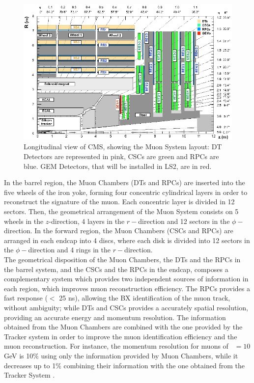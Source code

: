 \begin{center}
\begin{figure}[h]
\centering
\includegraphics[scale=0.4]{figuras/Chapter2/MuonSystem}
\caption{Longitudinal view of CMS, showing the Muon System layout: DT Detectors are represented in pink,
CSCs are green and RPCs are blue. GEM Detectors, that will be installed in LS2, are in red.}\label{figchp2:MuonSystem}
\end{figure}
\end{center}

In the barrel region, the Muon Chambers (DTs and RPCs) are inserted into the 
five wheels of the iron yoke, forming four concentric cylindrical layers in order
to reconstruct the signature of the muon. Each concentric layer is divided
in 12 sectors. Then, the geometrical arrangement of the Muon System consists on 
5 wheels in the $z$-direction, 4 layers in the $r-$direction and 12 sectors
in the $\phi-$direction. In the forward region, the Muon Chambers (CSCs and RPCs)
are arranged in each endcap into 4 discs, where each disk is divided into 
12 sectors in the $\phi-$direction and 4 rings in the $r-$direction. \\

The geometrical disposition of the Muon Chambers, the DTs and the RPCs in the barrel system, and 
the CSCs and the RPCs in the endcap, composes a complementary system which provides
two independent sources of information in each region, which improves 
muon reconstruction efficiency. The RPCs provides a fast response ($<$ 25 ns), allowing 
the BX identification of the muon track, without ambiguity; while 
DTs and CSCs provides a accurately spatial resolution, providing an accurate energy 
and momentum resolution. The information obtained from the Muon Chambers
are combined with the one provided by the Tracker system in order to 
improve the muon identification efficiency and the muon reconstruction. For instance,
the momentum resolution for muons of \pt~$= 10$ GeV is 10$\%$ using only the information
provided by Muon Chambers, while it decreases up to 1$\%$ combining their information with 
the one obtained from the Tracker System \cite{chp2:CMSTDR}.



